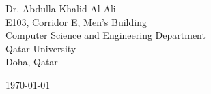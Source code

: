 \begin{minipage}{0.49\textwidth}
\begin{flushleft}
  \noindent
  Dr. Abdulla Khalid Al-Ali\\
E103, Corridor E, Men’s Building\\
Computer Science and Engineering Department\\
  Qatar University\\
Doha, Qatar
\end{flushleft}
\end{minipage}
\begin{minipage}{0.47\textwidth}
\begin{flushright}
\today
\end{flushright}
\end{minipage} \\

\newcommand{\univ}{Qatar University}
\newcommand{\univshort}{QU}

